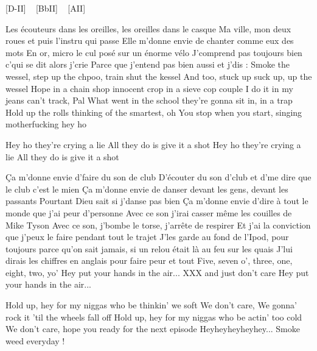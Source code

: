
[D-II] ~ [BbII] ~ [AII]

Les écouteurs dans les oreilles, les oreilles dans le casque
Ma ville, mon deux roues et puis l'instru qui passe
Elle m'donne envie de chanter comme eux des mots
En or, micro le cul posé sur un énorme vélo
J'comprend pas toujours bien c'qui se dit alors j'crie
Parce que j'entend pas bien aussi et j'dis :
Smoke the wessel, step up the chpoo, train shut the kessel
And too, stuck up suck up, up the wessel
Hope in a chain shop innocent crop in a sieve cop couple
I do it in my jeans can't track, Pal
What went in the school they're gonna sit in, in a trap
Hold up the rolls thinking of the smartest, oh
You stop when you start, singing motherfucking hey ho

Hey ho they're crying a lie
All they do is give it a shot
Hey ho they're crying a lie
All they do is give it a shot

Ça m'donne envie d'faire du son de club
D'écouter du son d'club et d'me dire que le club c'est le mien
Ça m'donne envie de danser devant les gens, devant les passants Pourtant Dieu sait si j'danse pas bien
Ça m'donne envie d'dire à tout le monde que j'ai peur d'personne
Avec ce son j'irai casser même les couilles de Mike Tyson
Avec ce son, j'bombe le torse, j'arrête de respirer
Et j'ai la conviction que j'peux le faire pendant tout le trajet J'les garde au fond de l'Ipod, pour toujours parce qu'on sait jamais, si un relou était là au feu sur les quais
J'lui dirais les chiffres en anglais pour faire peur et tout
Five, seven o', three, one, eight, two, yo'
Hey put your hands in the air...
XXX and just don't care
Hey put your hands in the air...

Hold up, hey for my niggas who be thinkin' we soft
We don't care, We gonna' rock it 'til the wheels fall off
Hold up, hey for my niggas who be actin' too cold
We don't care, hope you ready for the next episode
Heyheyheyheyhey... Smoke weed everyday ! 